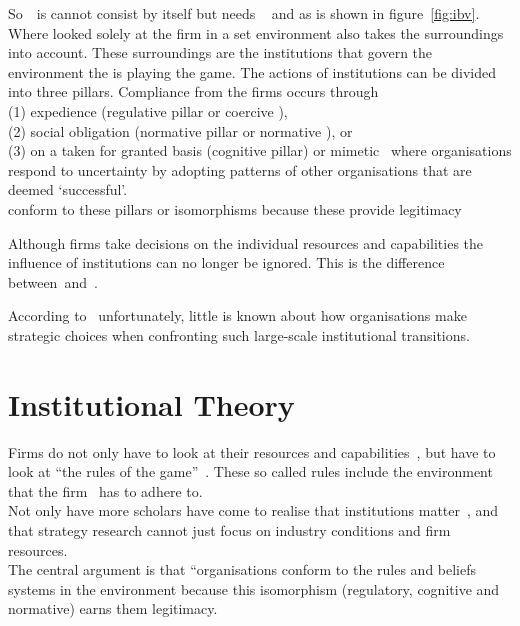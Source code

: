 So~\ibv~is cannot consist by itself but needs \rbv~\cite{Barney:1991} and \cite{Porter:1980} as is shown in figure~\ref{fig:ibv}. 
Where \rbv looked solely at the firm in a set environment \ibv also takes the surroundings into account. These surroundings are the institutions that govern the environment the \mne is playing the game. 
The actions of institutions can be divided into three pillars. Compliance from the firms occurs through \\(1) expedience (regulative pillar or coercive \iso),\\
 (2) social obligation (normative pillar or normative \iso), or \\
 (3) on a taken for granted basis (cognitive pillar) or mimetic \iso~where organisations respond to uncertainty by adopting patterns of other organisations that are deemed `successful'\cite{Westney:2005,Peng:2008,Kostova:1999,DiMaggio:1983,Scott:1995}.\\ 
\mne conform to these pillars or isomorphisms because these provide legitimacy~\cite{Powell:1991}

Although firms take decisions on the individual resources and capabilities \cite{Barney:1991} the influence of institutions can no longer be ignored. This is the difference between~\rbv and~\ibv. 

According to~\cite{Peng:2003} unfortunately, little is known about how organisations make strategic choices when confronting such large-scale institutional transitions.

\section{Institutional Theory}

 Firms do not only have to look at their resources and capabilities~\cite{Barney:1991}, but have to look at ``the rules of the game''~\cite{Scott:1995}. These so called rules include the environment that the firm \mne~has to adhere to.\\


Not only have   more scholars have come to realise that institutions matter~\cite{Powell:1991,Scott:1995}, and that strategy research cannot just focus on industry conditions and firm resources.\\

The central argument is that “organisations conform to the rules and beliefs systems in the environment because this isomorphism (regulatory, cognitive and normative) earns them legitimacy.

